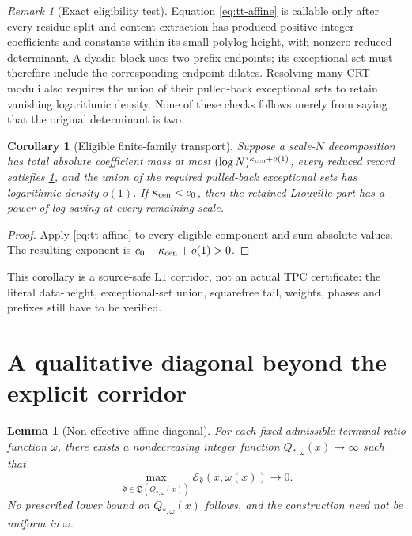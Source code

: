 \documentclass[11pt]{article}
\newtheorem{corollary}[theorem]{Corollary}
\newtheorem{lemma}[theorem]{Lemma}
\theoremstyle{definition}
\theoremstyle{remark}
\newtheorem{remark}[theorem]{Remark}
\newcommand{\Lone}{\mathrm{L1}}
\begin{document}
\begin{remark}[Exact eligibility test]
\label{rem:tt-eligibility}
Equation \eqref{eq:tt-affine} is callable only after every residue
split and content extraction has produced positive integer
coefficients and constants within its small-polylog height, with
nonzero reduced determinant.  A
dyadic block uses two prefix endpoints; its exceptional set must
therefore include the corresponding endpoint dilates.  Resolving
many CRT moduli also requires the union of their pulled-back
exceptional sets to retain vanishing logarithmic density.  None of
these checks follows merely from saying that the original
determinant is two.
\end{remark}

\begin{corollary}[Eligible finite-family transport]
\label{cor:tt-family}
Suppose a scale-\(N\) decomposition has total absolute coefficient
mass at most
\((\log N)^{\kappa_{\rm cen}+o(1)}\),
every reduced record satisfies \cref{rem:tt-eligibility}, and the
union of the required pulled-back exceptional sets has logarithmic
density \(o(1)\).  If \(\kappa_{\rm cen}<c_0\), then the retained
Liouville part has a power-of-log saving at every remaining scale.
\end{corollary}

\begin{proof}
Apply \eqref{eq:tt-affine} to every eligible component and sum
absolute values.  The resulting exponent is
\(c_0-\kappa_{\rm cen}+o(1)>0\).
\end{proof}

This corollary is a source-safe \(\Lone\) corridor, not an actual
TPC certificate: the literal data-height, exceptional-set union,
squarefree tail, weights, phases and prefixes still have to be
verified.

\section{A qualitative diagonal beyond the explicit corridor}

\begin{lemma}[Non-effective affine diagonal]
\label{lem:diagonal}
For each fixed admissible terminal-ratio function \(\omega\), there
exists a nondecreasing integer function
\(Q_{*,\omega}(x)\to\infty\) such that
\begin{equation}
 \max_{\mathfrak d\in\mathfrak D(Q_{*,\omega}(x))}
 \mathcal E_{\mathfrak d}(x,\omega(x))
 \longrightarrow0.
\label{eq:diagonal}
\end{equation}
No prescribed lower bound on \(Q_{*,\omega}(x)\) follows, and the
construction need not be uniform in \(\omega\).
\end{lemma}
\end{document}
